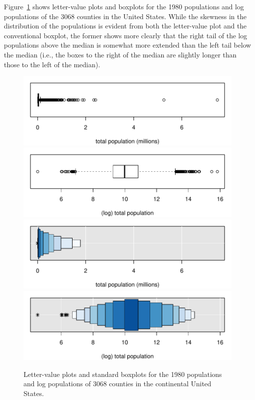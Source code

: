 \documentclass[oneside]{article}
\begin{document}
Figure~\ref{lvpops} shows letter-value plots and boxplots for the 1980 populations and log populations of the 3068 counties in the United States. While the skewness in the distribution of the populations is evident from both the letter-value plot and the conventional boxplot, the former shows more clearly that the right tail of the log populations above the median is somewhat more extended than the left tail below the median (i.e., the boxes to the right of the median are slightly longer than those to the left of the median).

\begin{figure}[hbtp]
  \centering
  \includegraphics[scale=.5]{counties-lvpop-a.pdf}
  \includegraphics[scale=.5]{counties-lvpop-c.pdf}
  \includegraphics[scale=.5]{counties-lvpop-b.pdf}
  \includegraphics[scale=.5]{counties-lvpop-d.pdf}
 
  \caption{Letter-value plots and standard boxplots for the 1980
  populations and log populations of 3068 counties in the continental United
  States.}
  \label{lvpops} 
\end{figure}
\end{document}
